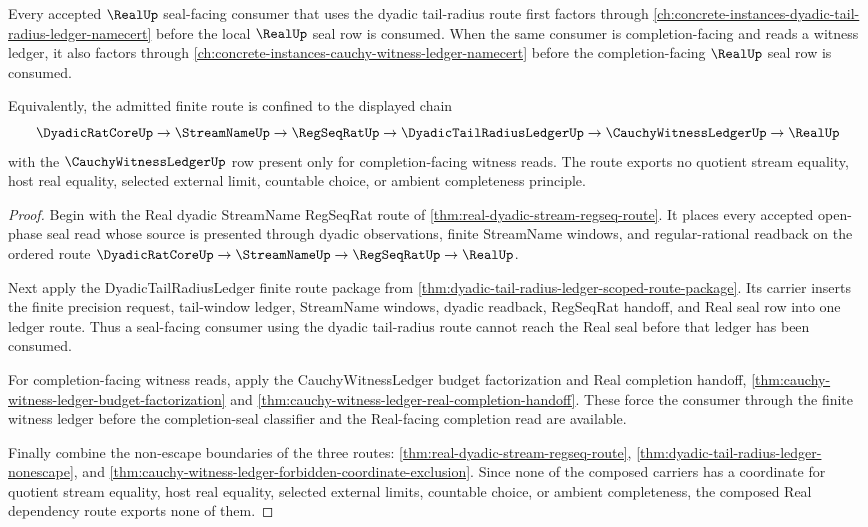 \begin{theorem}
\label{thm:real-dyadic-tail-radius-ledger-dependency}
Every accepted $\RealUp$ seal-facing consumer that uses the dyadic tail-radius
route first factors through
\autoref{ch:concrete-instances-dyadic-tail-radius-ledger-namecert} before the
local $\RealUp$ seal row is consumed. When the same consumer is
completion-facing and reads a witness ledger, it also factors through
\autoref{ch:concrete-instances-cauchy-witness-ledger-namecert} before the
completion-facing $\RealUp$ seal row is consumed.

Equivalently, the admitted finite route is confined to the displayed chain
$$
\DyadicRatCoreUp \to \StreamNameUp \to \RegSeqRatUp
\to \DyadicTailRadiusLedgerUp \to \CauchyWitnessLedgerUp \to \RealUp
$$
with the $\CauchyWitnessLedgerUp$ row present only for completion-facing
witness reads. The route exports no quotient stream equality, host real
equality, selected external limit, countable choice, or ambient completeness
principle.
\end{theorem}
\begin{proof}
Begin with the Real dyadic StreamName RegSeqRat route of
\autoref{thm:real-dyadic-stream-regseq-route}. It places every accepted
open-phase seal read whose source is presented through dyadic observations,
finite StreamName windows, and regular-rational readback on the ordered route
$\DyadicRatCoreUp \to \StreamNameUp \to \RegSeqRatUp \to \RealUp$.

Next apply the DyadicTailRadiusLedger finite route package from
\autoref{thm:dyadic-tail-radius-ledger-scoped-route-package}. Its carrier
inserts the finite precision request, tail-window ledger, StreamName windows,
dyadic readback, RegSeqRat handoff, and Real seal row into one ledger route.
Thus a seal-facing consumer using the dyadic tail-radius route cannot reach
the Real seal before that ledger has been consumed.

For completion-facing witness reads, apply the CauchyWitnessLedger budget
factorization and Real completion handoff,
\autoref{thm:cauchy-witness-ledger-budget-factorization} and
\autoref{thm:cauchy-witness-ledger-real-completion-handoff}. These force the
consumer through the finite witness ledger before the completion-seal
classifier and the Real-facing completion read are available.

Finally combine the non-escape boundaries of the three routes:
\autoref{thm:real-dyadic-stream-regseq-route},
\autoref{thm:dyadic-tail-radius-ledger-nonescape}, and
\autoref{thm:cauchy-witness-ledger-forbidden-coordinate-exclusion}. Since none
of the composed carriers has a coordinate for quotient stream equality, host
real equality, selected external limits, countable choice, or ambient
completeness, the composed Real dependency route exports none of them.
\end{proof}

